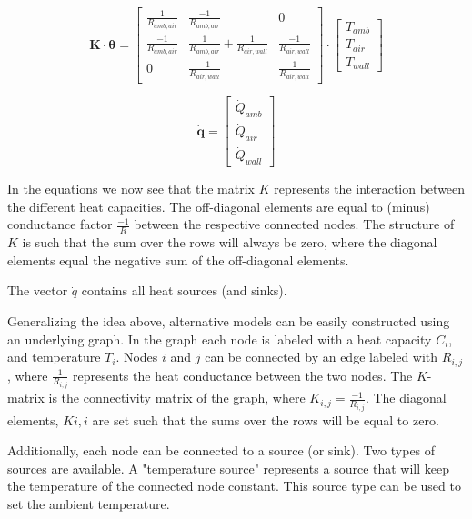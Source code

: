 \begin{equation}
	\mathbf{K} \cdot \boldsymbol{\theta} =
	\begin{bmatrix}
		\frac{1}{R_{amb, air}}  & \frac{-1}{R_{amb,air}} & 0  \\
		\frac{-1}{R_{amb, air}} &  \frac{1}{R_{amb, air}} + \frac{1}{R_{air,wall}} &  \frac{-1}{R_{air,wall}} \\
		 0 & \frac{-1}{R_{air, wall}}  & \frac{1}{R_{air,wall}} 
	\end{bmatrix}
	\cdot
	\begin{bmatrix}
		T_{amb} \\
		T_{air} \\
		T_{wall}
	\end{bmatrix}
\end{equation}

\begin{equation}
	\mathbf{\dot{q}} =
	\begin{bmatrix}
		\dot{Q}_{amb}\\
		\dot{Q}_{air} \\
		\dot{Q}_{wall} 
	\end{bmatrix}
\end{equation}

In the equations we now see that the matrix $K$ represents the interaction between the different heat capacities.  The off-diagonal elements are equal to (minus) conductance factor $\frac{-1}{R}$ between the respective connected nodes. The structure of $K$ is such that the sum over the rows will always be zero, where the diagonal elements equal the negative sum of the off-diagonal elements.

The vector $\dot{q}$ contains all heat sources (and sinks). 

Generalizing the idea above, alternative models can be easily constructed using an underlying graph. In the graph each node is labeled with a heat capacity $C_i$, and temperature $T_i$. Nodes $i$ and $j$ can be connected by an edge labeled with $R_{i,j}$, where $\frac{1}{R_{i,j}}$ represents the heat conductance between the two nodes. The $K$-matrix is the connectivity matrix of the graph, where $K_{i,j} = \frac{-1}{R_{i,j}}$. The diagonal elements, $K{i,i}$ are set such that the sums over the rows will be equal to zero.
 

Additionally, each node can be connected to a source (or sink). Two types of sources are available. A "temperature source" represents a source that will keep the temperature of the connected node constant. This source type can be used to set the ambient temperature.   

